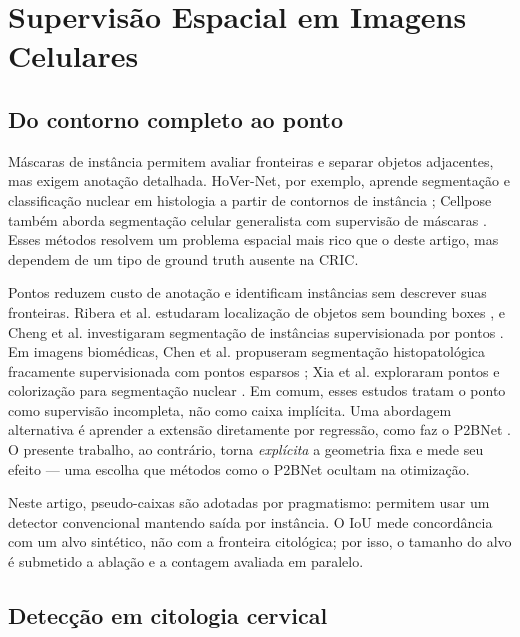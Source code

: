﻿\FloatBarrier
\section{Supervis\~ao Espacial em Imagens Celulares}

\subsection{Do contorno completo ao ponto}

M\'ascaras de inst\^ancia permitem avaliar fronteiras e separar objetos
adjacentes, mas exigem anota\c{c}\~ao detalhada. HoVer-Net, por exemplo, aprende
segmenta\c{c}\~ao e classifica\c{c}\~ao nuclear em histologia a partir de contornos
de inst\^ancia \cite{graham2019hovernet}; Cellpose tamb\'em aborda segmenta\c{c}\~ao
celular generalista com supervis\~ao de m\'ascaras \cite{stringer2021cellpose}.
Esses m\'etodos resolvem um problema espacial mais rico que o deste artigo, mas
dependem de um tipo de ground truth ausente na CRIC.

Pontos reduzem custo de anota\c{c}\~ao e identificam inst\^ancias sem descrever
suas fronteiras. Ribera et al. estudaram localiza\c{c}\~ao de objetos sem bounding
boxes \cite{ribera2019locating}, e Cheng et al. investigaram segmenta\c{c}\~ao de
inst\^ancias supervisionada por pontos \cite{cheng2022pointly}. Em imagens
biom\'edicas, Chen et al. propuseram segmenta\c{c}\~ao histopatol\'ogica fracamente
supervisionada com pontos esparsos \cite{chen2021sparsepoints}; Xia et al.
exploraram pontos e coloriza\c{c}\~ao para segmenta\c{c}\~ao nuclear
\cite{xia2023colorization}. Em comum, esses estudos tratam o ponto como supervis\~ao incompleta, n\~ao como
caixa impl\'icita. Uma abordagem alternativa \'e aprender a extens\~ao diretamente
por regress\~ao, como faz o P2BNet \cite{chen2023p2bnet}. O presente trabalho,
ao contr\'ario, torna \emph{expl\'icita} a geometria fixa e mede seu efeito ---
uma escolha que m\'etodos como o P2BNet ocultam na otimiza\c{c}\~ao.

Neste artigo, pseudo-caixas s\~ao adotadas por pragmatismo: permitem usar um
detector convencional mantendo sa\'ida por inst\^ancia. O IoU mede concord\^ancia
com um alvo sint\'etico, n\~ao com a fronteira citol\'ogica; por isso, o tamanho
do alvo \'e submetido a abla\c{c}\~ao e a contagem avaliada em paralelo.

\subsection{Detec\c{c}\~ao em citologia cervical}

